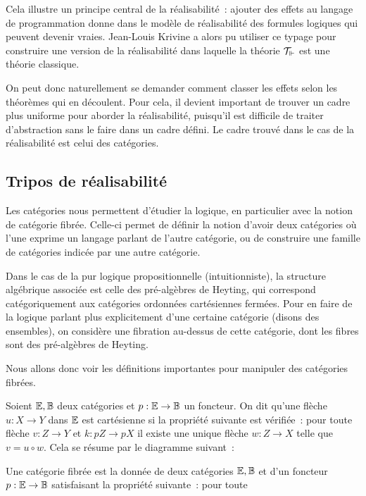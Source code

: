 \documentclass{article}
\begin{document}
Cela illustre un principe central de la réalisabilité~: ajouter des effets au langage de programmation donne dans le modèle de réalisabilité des formules logiques qui peuvent devenir vraies. Jean-Louis Krivine a alors pu utiliser ce typage pour construire une version de la réalisabilité dans laquelle la théorie $\mathcal T_\Vdash$ est une théorie classique.

On peut donc naturellement se demander comment classer les effets selon les théorèmes qui en découlent. Pour cela, il devient important de trouver un cadre plus uniforme pour aborder la réalisabilité, puisqu'il est difficile de traiter d'abstraction sans le faire dans un cadre défini. Le cadre trouvé dans le cas de la réalisabilité est celui des catégories.

\subsection{Tripos de réalisabilité}

Les catégories nous permettent d'étudier la logique, en particulier avec la notion de catégorie fibrée. Celle-ci permet de définir la notion d'avoir deux catégories où l'une exprime un langage parlant de l'autre catégorie, ou de construire une famille de catégories indicée par une autre catégorie.

Dans le cas de la pur logique propositionnelle (intuitionniste), la structure algébrique associée est celle des pré-algèbres de Heyting, qui correspond catégoriquement aux catégories ordonnées cartésiennes fermées. Pour en faire de la logique parlant plus explicitement d'une certaine catégorie (disons des ensembles), on considère une fibration au-dessus de cette catégorie, dont les fibres sont des pré-algèbres de Heyting.

Nous allons donc voir les définitions importantes pour manipuler des catégories fibrées.

\begin{defi}
  Soient $\mathbb{E},\mathbb{B}$ deux catégories et $p : \mathbb{E} \to \mathbb{B}$ un foncteur. On dit qu'une flèche $u : X \to Y$ dans $\mathbb{E}$ est cartésienne si la propriété suivante est vérifiée~: pour toute flèche $v : Z \to Y$ et $k : pZ \to pX$ il existe une unique flèche $w : Z \to X$ telle que $v = u\circ w$. Cela se résume par le diagramme suivant~:
\end{defi}

\begin{defi}
  Une catégorie fibrée est la donnée de deux catégories $\mathbb{E},\mathbb{B}$ et d'un foncteur $p : \mathbb{E} \to \mathbb{B}$ satisfaisant la propriété suivante~: pour toute
\end{defi}
\end{document}
